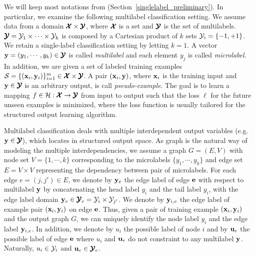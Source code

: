 {We will keep most notations from (Section~\ref{singlelabel_preliminary}).
In particular, we examine the following multilabel classification setting.
We assume data from a domain $\pmb {\mathcal{X}}\times\pmb {\mathcal{Y}}$, where $\pmb {\mathcal{X}}$ is a set and $\pmb {\mathcal{Y}}$ is the set of multilabels.
$\pmb {\mathcal{Y}} = \mathcal{Y}_1\times\cdots\times\mathcal{Y}_k$ is composed by a Cartesian product of $k$ sets $\mathcal{Y}_i=\{-1,+1\}$.
We retain a single-label classification setting by letting $k=1$.
A vector $\mathbf {y}=(y_1,\cdots,y_k)\in\pmb {\mathcal{Y}}$ is called \textit{multilabel} and each element $y_j$ is called \textit{microlabel}.
In addition, we are given a set of labeled training examples $\mathcal{S}=\{(\mathbf {x}_i,\mathbf {y}_i)\}_{i=1}^{m}\in\pmb {\mathcal{X}}\times\pmb {\mathcal{Y}}$. 
A pair $(\mathbf {x}_i,\mathbf {y})$, where $\mathbf {x}_i$ is the training input and $\mathbf {y}\in\pmb {\mathcal{Y}}$ is an arbitrary output, is call \textit{pseudo-example}.
The goal is to learn a mapping $f\in\mathcal{H}:\pmb {\mathcal{X}}\rightarrow\pmb {\mathcal{Y}}$ from input to output such that the loss $\ell$ for the future unseen examples is minimized, where the loss function is usually tailored for the structured output learning algorithm.

Multilabel classification deals with multiple interdependent output variables (e.g. $\mathbf {y}\in\pmb {\mathcal{Y}}$), which locates in structured output space.
As graph is the natural way of modeling the multiple interdependencies, we assume a graph $G=(E,V)$ with node set $V=\{1,\cdots,k\}$ corresponding to the microlabels $\{y_1,\cdots,y_k\}$ and edge set $E=V\times V$ representing the dependency between pair of microlabels.
For each edge $e=(j,j')\in E$, we denote by $\mathbf {y}_e$ the edge label of edge $\mathbf {e}$ with respect to multilabel $\mathbf {y}$ by concatenating the head label $y_i$ and the tail label $y_i$, with the edge label domain $\mathbf {y}_e\in\pmb {\mathcal{Y}}_e=\mathcal{Y}_i\times\mathcal{Y}_{j'}$.
We denote by $\mathbf {y}_{i,e}$ the edge label of example pair $(\mathbf {x}_i,\mathbf {y}_i)$ on edge $\mathbf {e}$.
Thus, given a pair of training example $(\mathbf {x}_i,\mathbf {y}_i)$ and the output graph $G$, we can uniquely identify the node label $y_i$ and the edge label $\mathbf {y}_{i,e}$.
In addition, we denote by $u_i$ the possible label of node $i$ and by $\mathbf {u}_{e}$ the possible label of edge $\mathbf {e}$ where $u_i$ and $\mathbf {u}_{e}$ do not constraint to any multilabel $\mathbf {y}$.
Naturally, $u_i\in\mathcal{Y}_i$ and $\mathbf {u}_e\in\pmb {\mathcal{Y}}_e$.


%


%
}
